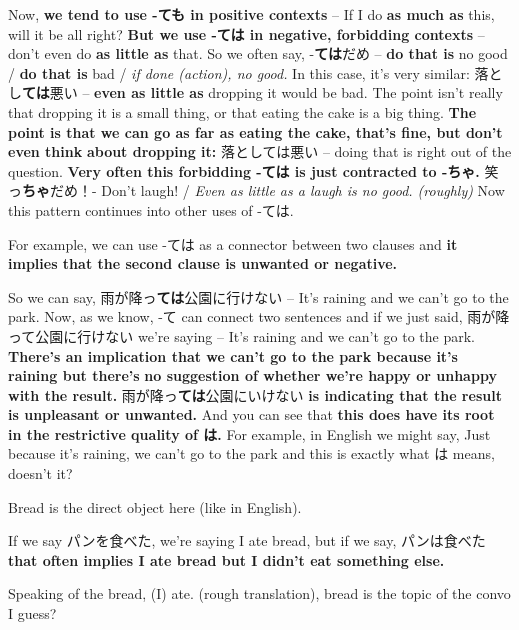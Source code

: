 Now, {\bf we tend to use -ても in positive contexts} -- If I do {\bf as much as} this, will it be all right? {\bf But we use -ては in negative, forbidding contexts} -- don't even do {\bf as little as} that. So we often say, -{\bf ては}だめ -- {\bf do that is} no good / {\bf do that is} bad / {\em if done (action), no good.} In this case, it's very similar: 落とし{\bf ては}悪い -- {\bf even as little as} dropping it would be bad. The point isn't really that dropping it is a small thing, or that eating the cake is a big thing. {\bf The point is that we can go as far as eating the cake, that's fine, but don't even think} {\bf about dropping it:} 落としては悪い -- doing that is right out of the question. {\bf Very often this forbidding -ては is just contracted to -ちゃ.} 笑っ{\bf ちゃ}だめ！- Don't laugh! / {\em Even as little as a laugh is no good. (roughly)} Now this pattern continues into other uses of -ては.

\stopsectionlevel

\startsectionlevel[title={ては as a connector between two clauses},reference={ては-as-a-connector-between-two-clauses}]

For example, we can use -ては as a connector between two clauses and {\bf it implies that the second clause is unwanted or negative.}

{}

So we can say, 雨が降っ{\bf ては}公園に行けない -- It's raining and we can't go to the park. Now, as we know, -て can connect two sentences and if we just said, 雨が降って公園に行けない we're saying -- It's raining and we can't go to the park. {\bf There's an implication that we can't go to the park because it's raining but there's} {\bf no suggestion of whether we're happy or unhappy with the result.} 雨が降っ{\bf ては}公園にいけない {\bf is indicating that the result is unpleasant or unwanted.} And you can see that {\bf this does have its root in the restrictive quality of は.} For example, in English we might say, Just because it's raining, we can't go to the park and this is exactly what は means, doesn't it?

Bread is the direct object here (like in English).

If we say パンを食べた, we're saying I ate bread, but if we say, パンは食べた {\bf that often implies I ate bread but I didn't eat something else.}

Speaking of the bread, (I) ate. (rough translation), bread is the topic of the convo I guess?

